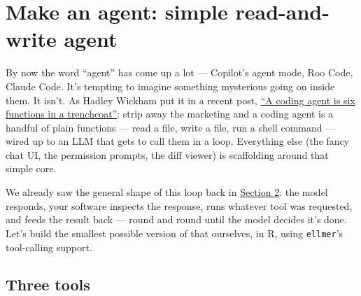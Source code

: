 \documentclass[
  letterpaper,
  DIV=11,
  numbers=noendperiod]{scrreprt}
\begin{document}
\chapter{Make an agent: simple read-and-write
agent}\label{make-an-agent-simple-read-and-write-agent}

By now the word ``agent'' has come up a lot --- Copilot's agent mode,
Roo Code, Claude Code. It's tempting to imagine something mysterious
going on inside them. It isn't. As Hadley Wickham put it in a recent
post,
\href{https://tidydesign.substack.com/p/a-coding-agent-is-six-functions-in}{``A
coding agent is six functions in a trenchcoat''}: strip away the
marketing and a coding agent is a handful of plain functions --- read a
file, write a file, run a shell command --- wired up to an LLM that gets
to call them in a loop. Everything else (the fancy chat UI, the
permission prompts, the diff viewer) is scaffolding around that simple
core.

We already saw the general shape of this loop back in
\hyperref[how-agents-work]{Section 2}: the model responds, your software
inspects the response, runs whatever tool was requested, and feeds the
result back --- round and round until the model decides it's done. Let's
build the smallest possible version of that ourselves, in R, using
\texttt{ellmer}'s tool-calling support.

\section{Three tools}\label{three-tools}
\end{document}
